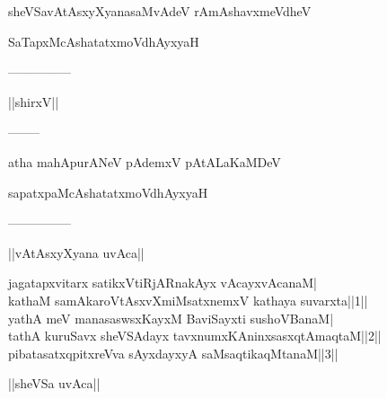 \documentclass{article}
\begin{document}
\begin{center}
sheVSavAtAsxyXyanasaMvAdeV rAmAshavxmeVdheV
\end{center}

\begin{center}
SaTapxMcAshatatxmoVdhAyxyaH
\end{center}

\begin{center}
---------------
\end{center}

\begin{center}
||shirxV||
\end{center}

\begin{center}
--------
\end{center}

\begin{center}
atha mahApurANeV pAdemxV pAtALaKaMDeV
\end{center}

\begin{center}
sapatxpaMcAshatatxmoVdhAyxyaH
\end{center}

\begin{center}
---------------
\end{center}

\begin{center}
||vAtAsxyXyana uvAca||
\end{center}

jagatapxvitarx satikxVtiRjARnakAyx vAcayxvAcanaM|\\
kathaM samAkaroVtAsxvXmiMsatxnemxV kathaya suvarxta||1||\\
yathA meV manasaswsxKayxM BaviSayxti sushoVBanaM|\\
tathA kuruSavx sheVSAdayx tavxnumxKAninxsasxqtAmaqtaM||2||\\
pibatasatxqpitxreVva sAyxdayxyA saMsaqtikaqMtanaM||3||\\

\begin{center}
||sheVSa uvAca||
\end{center}
\end{document}
